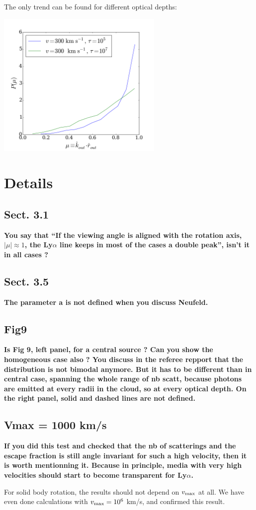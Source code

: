 \documentclass[12pt]{article}
\begin{document}
The only trend can be found for different optical depths:

\begin{center}
\includegraphics[width=0.6\textwidth]{../code/surface_mu_diff_tau.png}
\end{center}

\section*{Details}

\subsection*{Sect. 3.1}

{\bf You say that “If the viewing angle is aligned with the rotation
  axis, $|\mu| \approx 1$, the Ly$\alpha$ line keeps in most of the
  cases a double peak”, isn’t it in all cases ?} 

\subsection*{Sect. 3.5}
{\bf The parameter a is not defined when you discuss Neufeld.} 

\subsection*{Fig9}

{\bf Is Fig 9, left panel, for a central source ? Can you show the
  homogeneous case also ? You discuss in the referee repport that the
  distribution is not bimodal anymore. But it has to be different than
  in central case, spanning the whole range of nb scatt, because
  photons are emitted at every radii in the cloud, so at every optical
  depth. On the right panel, solid and dashed lines are not defined.} 

\subsection*{Vmax = 1000 km/s}
{\bf If you did this test and checked that the nb of scatterings and
  the escape fraction is still angle invariant for such a high
  velocity, then it is worth mentionning it. Because in principle,
  media with very high velocities should start to become transparent
  for Ly$\alpha$.}  

For solid body rotation, the results should not depend on $v_{\rm
  max}$ at all. We have even done calculations with $v_{\rm max}=10^6$
km/s, and confirmed this result. 
\end{document}
